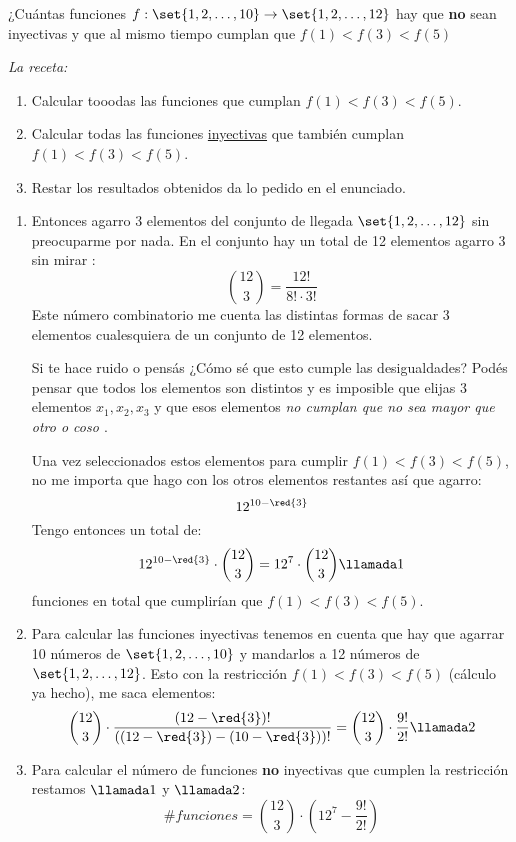 \begin{enunciado}{\ejExtra}
  ¿Cuántas funciones $f: \set{1,2,\dots,10}\to \set{1,2,\dots,12}$ hay que \textbf{no} sean inyectivas y que
  al mismo tiempo cumplan que $f(1) < f(3) < f(5)$
\end{enunciado}
\textit{La receta:}
\begin{enumerate}[label=\arabic*)]
  \item Calcular tooodas las funciones que cumplan $f(1) < f(3) < f(5)$.
  \item Calcular todas las funciones \underline{inyectivas} que también cumplan $f(1) < f(3) < f(5)$.
  \item Restar los resultados obtenidos da lo pedido en el enunciado.
\end{enumerate}

\begin{enumerate}[label=\arabic*)]
  \item
        Entonces agarro 3 elementos del conjunto de llegada $\set{1,2,\dots,12}$ sin preocuparme por nada. En el conjunto
        hay un total de 12 elementos agarro 3 sin mirar :
        $$
          \binom{12}{3} = \frac{12!}{8! \cdot 3!}
        $$
        Este número combinatorio me cuenta las distintas formas de sacar 3 elementos cualesquiera de un conjunto de 12 elementos.

        Si te hace ruido o pensás ¿Cómo sé que esto cumple las desigualdades? Podés pensar que todos los elementos son distintos y es imposible que elijas
        3 elementos $x_1, x_2, x_3$ y que esos elementos \textit{no cumplan que no sea mayor que otro o coso \href{\mindExplosion}{}}.

        Una vez seleccionados estos  elementos para cumplir $f(1) < f(3) < f(5)$, no me importa que hago con los otros elementos restantes
        así que agarro:
        $$
          12^{10-\red{3}}
        $$
        Tengo entonces un total de:
        $$
          12^{10-\red{3}} \cdot \binom{12}{3} = 12^7 \cdot \binom{12}{3} \llamada1
        $$
        funciones en total que cumplirían que $f(1) < f(3) < f(5)$.

  \item
        Para calcular las funciones inyectivas tenemos en cuenta que hay que agarrar 10 números de $\set{1,2,\dots,10}$ y mandarlos a 12 números
                de $\set{1,2,\dots,12}$. Esto con la restricción $f(1) < f(3) < f(5)$ (cálculo ya hecho), me saca  elementos:
        $$
          \binom{12}{3} \cdot \frac{(12 - \red{3})!}{((12 - \red{3}) - (10 - \red{3}))!}  = \binom{12}{3} \cdot \frac{9!}{2!}\llamada2
        $$

  \item
        Para calcular el número de funciones \textbf{no} inyectivas que cumplen la restricción restamos $\llamada1$ y $\llamada2$:
        $$
          \#funciones = \binom{12}{3} \cdot (12^7 - \frac{9!}{2!})
        $$
\end{enumerate}

\begin{aportes}
  \item {}
  \item {}
\end{aportes}
